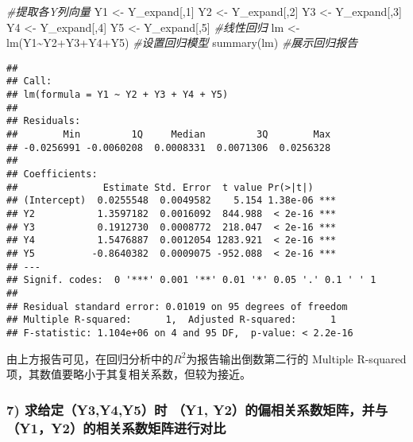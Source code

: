 \documentclass[
]{article}
\newenvironment{Shaded}{\begin{snugshade}}{\end{snugshade}}
\newcommand{\CommentTok}[1]{\textcolor[rgb]{0.56,0.35,0.01}{\textit{#1}}}
\newcommand{\DecValTok}[1]{\textcolor[rgb]{0.00,0.00,0.81}{#1}}
\newcommand{\FunctionTok}[1]{\textcolor[rgb]{0.00,0.00,0.00}{#1}}
\newcommand{\NormalTok}[1]{#1}
\newcommand{\OtherTok}[1]{\textcolor[rgb]{0.56,0.35,0.01}{#1}}
\newcommand{\SpecialCharTok}[1]{\textcolor[rgb]{0.00,0.00,0.00}{#1}}
\begin{document}
\begin{Shaded}
\begin{Highlighting}[]
\CommentTok{\#提取各Y列向量}
\NormalTok{Y1 }\OtherTok{\textless{}{-}}\NormalTok{ Y\_expand[,}\DecValTok{1}\NormalTok{]}
\NormalTok{Y2 }\OtherTok{\textless{}{-}}\NormalTok{ Y\_expand[,}\DecValTok{2}\NormalTok{]}
\NormalTok{Y3 }\OtherTok{\textless{}{-}}\NormalTok{ Y\_expand[,}\DecValTok{3}\NormalTok{]}
\NormalTok{Y4 }\OtherTok{\textless{}{-}}\NormalTok{ Y\_expand[,}\DecValTok{4}\NormalTok{]}
\NormalTok{Y5 }\OtherTok{\textless{}{-}}\NormalTok{ Y\_expand[,}\DecValTok{5}\NormalTok{]}
\CommentTok{\#线性回归}
\NormalTok{lm }\OtherTok{\textless{}{-}} \FunctionTok{lm}\NormalTok{(Y1}\SpecialCharTok{\textasciitilde{}}\NormalTok{Y2}\SpecialCharTok{+}\NormalTok{Y3}\SpecialCharTok{+}\NormalTok{Y4}\SpecialCharTok{+}\NormalTok{Y5) }\CommentTok{\#设置回归模型}
\FunctionTok{summary}\NormalTok{(lm) }\CommentTok{\#展示回归报告}
\end{Highlighting}
\end{Shaded}

\begin{verbatim}
## 
## Call:
## lm(formula = Y1 ~ Y2 + Y3 + Y4 + Y5)
## 
## Residuals:
##        Min         1Q     Median         3Q        Max 
## -0.0256991 -0.0060208  0.0008331  0.0071306  0.0256328 
## 
## Coefficients:
##               Estimate Std. Error  t value Pr(>|t|)    
## (Intercept)  0.0255548  0.0049582    5.154 1.38e-06 ***
## Y2           1.3597182  0.0016092  844.988  < 2e-16 ***
## Y3           0.1912730  0.0008772  218.047  < 2e-16 ***
## Y4           1.5476887  0.0012054 1283.921  < 2e-16 ***
## Y5          -0.8640382  0.0009075 -952.088  < 2e-16 ***
## ---
## Signif. codes:  0 '***' 0.001 '**' 0.01 '*' 0.05 '.' 0.1 ' ' 1
## 
## Residual standard error: 0.01019 on 95 degrees of freedom
## Multiple R-squared:      1,  Adjusted R-squared:      1 
## F-statistic: 1.104e+06 on 4 and 95 DF,  p-value: < 2.2e-16
\end{verbatim}

由上方报告可见，在回归分析中的\(R^2\)为报告输出倒数第二行的 Multiple
R-squared 项，其数值要略小于其复相关系数，但较为接近。

\hypertarget{ux6c42ux7ed9ux5b9ay3y4y5ux65f6-y1-y2ux7684ux504fux76f8ux5173ux7cfbux6570ux77e9ux9635ux5e76ux4e0ey1y2ux7684ux76f8ux5173ux7cfbux6570ux77e9ux9635ux8fdbux884cux5bf9ux6bd4}{%
\subsubsection{\texorpdfstring{\textbf{7) 求给定（Y3,Y4,Y5）时 （Y1,
Y2）的偏相关系数矩阵，并与（Y1，Y2）的相关系数矩阵进行对比}}{7) 求给定（Y3,Y4,Y5）时 （Y1, Y2）的偏相关系数矩阵，并与（Y1，Y2）的相关系数矩阵进行对比}}\label{ux6c42ux7ed9ux5b9ay3y4y5ux65f6-y1-y2ux7684ux504fux76f8ux5173ux7cfbux6570ux77e9ux9635ux5e76ux4e0ey1y2ux7684ux76f8ux5173ux7cfbux6570ux77e9ux9635ux8fdbux884cux5bf9ux6bd4}}
\end{document}
